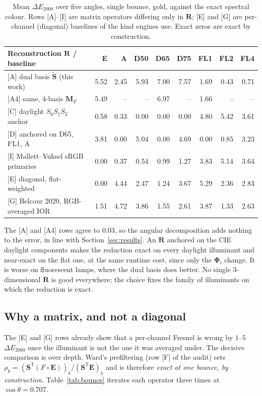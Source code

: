 \documentclass[11pt,a4paper]{article}
\newcommand{\mS}{\mathbf{S}}
\newcommand{\mSd}{\tilde{\mathbf{S}}}
\newcommand{\mR}{\mathbf{R}}
\newcommand{\mPhi}{\boldsymbol{\Phi}}
\newcommand{\mM}{\mathbf{M}}
\newcommand{\vE}{\mathbf{E}}
\newcommand{\dE}{\Delta E_{2000}}
\newcommand{\transp}{^{\mathsf{T}}}
\begin{document}
\begin{table}[h]\centering\small
\begin{tabular}{@{}lrrrrrrrr@{}}
\toprule
Reconstruction $\mR$ / baseline & E & A & D50 & D65 & D75 & FL1 & FL2 & FL4 \\
\midrule
{[A]} dual basis $\mSd$ (this work)     & 5.52 & 2.45 & 5.93 & 7.00 & 7.57 & 1.69 & 0.43 & 0.71 \\
{[A4]} same, 4-basis $\mM_F$            & 5.49 & --   & --   & 6.97 & --   & 1.66 & --   & --   \\
{[C]} daylight $S_0S_1S_2$ anchor       & 0.58 & 0.33 & 0.00 & 0.00 & 0.00 & 4.80 & 5.42 & 3.61 \\
{[D]} anchored on D65, FL1, A           & 3.81 & 0.00 & 5.04 & 0.00 & 4.69 & 0.00 & 0.85 & 3.23 \\
{[I]} Mallett--Yuksel sRGB primaries    & 0.00 & 0.37 & 0.54 & 0.99 & 1.27 & 3.83 & 5.14 & 3.64 \\
\addlinespace
{[E]} diagonal, flat-weighted           & 0.00 & 4.44 & 2.47 & 1.24 & 3.67 & 5.29 & 2.36 & 2.83 \\
{[G]} Belcour 2020, RGB-averaged IOR    & 1.51 & 4.72 & 3.86 & 1.55 & 2.61 & 3.87 & 1.33 & 2.63 \\
\bottomrule
\end{tabular}
\caption{Mean $\dE$ over five angles, single bounce, gold, against the exact
spectral colour.  Rows [A]--[I] are matrix operators differing only in
$\mR$; [E] and [G] are per-channel (diagonal) baselines of the kind engines
use.  Exact zeros are exact by construction.}
\label{tab:audit}
\end{table}

The [A] and [A4] rows agree to $0.03$, so the angular decomposition adds
nothing to the error, in line with Section~\ref{sec:results}.  An $\mR$
anchored on the CIE daylight components makes the reduction exact on every
daylight illuminant and near-exact on the flat one, at the same runtime cost,
since only the $\mPhi_i$ change.  It is worse on fluorescent lamps, where the
dual basis does better.  No single $3$-dimensional $\mR$ is good everywhere;
the choice fixes the family of illuminants on which the reduction is exact.

\subsection{Why a matrix, and not a diagonal}

The [E] and [G] rows already show that a per-channel Fresnel is wrong by
$1$--$5$ $\dE$ once the illuminant is not the one it was averaged under.  The
decisive comparison is over depth.  Ward's prefiltering (row [F] of the audit)
sets $\rho_k=(\mS\transp(F\circ\vE))_k/(\mS\transp\vE)_k$ and is therefore
\emph{exact at one bounce, by construction}.  Table~\ref{tab:bounce} iterates
each operator three times at $\cos\theta=0.707$.
\end{document}
